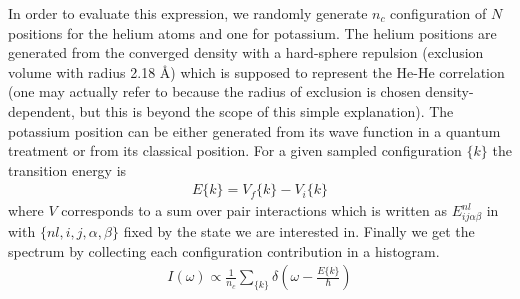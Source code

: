 In order to evaluate this expression, we randomly generate $n_c$ configuration of $N$ positions for the helium atoms and one for potassium. 
The helium positions are generated from the converged density with a hard-sphere repulsion (exclusion volume with radius 2.18 \AA{}) which is supposed to represent the He-He correlation (one may actually refer to \cite{DFTguide} because the radius of exclusion is chosen density-dependent, but this is beyond the scope of this simple explanation). 
The potassium position can be either generated from its wave function in a quantum treatment or from its classical position. For a given sampled configuration $\{k\}$ the transition energy is
\begin{align}
E\{k\}=V_f\{k\}-V_i\{k\}
\end{align}
where $V$ corresponds to a sum over pair interactions which is written as $E^{nl}_{ij\alpha\beta}$ in  with $\{nl,i,j,\alpha,\beta\}$ fixed by the state we are interested in. 
Finally we get the spectrum by collecting each configuration contribution in a histogram.
\begin{align}
I(\omega)\propto \frac{1}{n_c} \sum_{\{k\}} \delta \left(\omega-\frac{E\{k\}}{\hbar}\right) 
\end{align}

